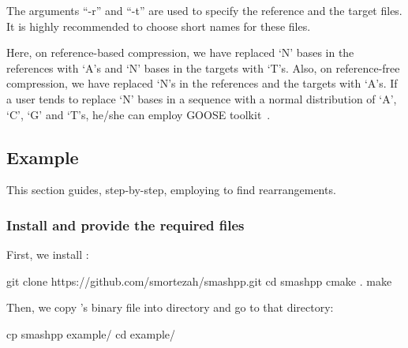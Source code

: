 The arguments ``-r'' and ``-t'' are used to specify the reference and the target files. It is highly recommended to choose short names for these files.

Here, on reference-based compression, we have replaced `N' bases in the references with `A's and `N' bases in the targets with `T's. Also, on reference-free compression, we have replaced `N's in the references and the targets with `A's. If a user tends to replace `N' bases in a sequence with a normal distribution of `A', `C', `G' and `T's, he/she can employ GOOSE toolkit~\cite{web-goose}.





\subsection{Example}
This section guides, step-by-step, employing \smashpp to find rearrangements.

\subsubsection*{Install \smashpp and provide the required files}
First, we install \smashpp:
\begin{code}[style=bash]
git clone https://github.com/smortezah/smashpp.git
cd smashpp
cmake .
make
\end{code}
Then, we copy \smashpp's binary file into  directory and go to that directory:
\begin{code}[style=bash]
cp smashpp example/
cd example/
\end{code}



